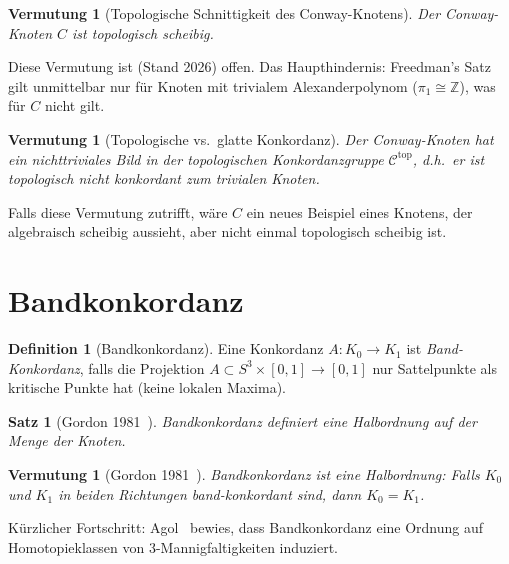 \documentclass[12pt,a4paper]{amsart}
\newtheorem{satz}[theorem]{Satz}
\newtheorem{vermutung}[theorem]{Vermutung}
\theoremstyle{definition}
\newtheorem{definition_de}[theorem]{Definition}
\theoremstyle{remark}
\newcommand{\Z}{\mathbb{Z}}
\begin{document}
\begin{vermutung}[Topologische Schnittigkeit des Conway-Knotens]
\label{verm:Conway-top}
Der Conway-Knoten $C$ ist topologisch scheibig.
\end{vermutung}

Diese Vermutung ist (Stand 2026) offen. Das Haupthindernis: Freedman's
Satz gilt unmittelbar nur für Knoten mit trivialem Alexanderpolynom
($\pi_1 \cong \Z$), was für $C$ nicht gilt.

\begin{vermutung}[Topologische vs.\ glatte Konkordanz]
Der Conway-Knoten hat ein nichttriviales Bild in der topologischen
Konkordanzgruppe $\mathcal{C}^{\mathrm{top}}$, d.h.\ er ist topologisch
nicht konkordant zum trivialen Knoten.
\end{vermutung}

Falls diese Vermutung zutrifft, wäre $C$ ein neues Beispiel eines Knotens,
der algebraisch scheibig aussieht, aber nicht einmal topologisch scheibig ist.

\section{Bandkonkordanz}

\begin{definition_de}[Bandkonkordanz]
Eine Konkordanz $A \colon K_0 \to K_1$ ist \emph{Band-Konkordanz}, falls
die Projektion $A \subset S^3 \times [0,1] \to [0,1]$ nur Sattelpunkte
als kritische Punkte hat (keine lokalen Maxima).
\end{definition_de}

\begin{satz}[Gordon 1981~\cite{Gordon1981}]
Bandkonkordanz definiert eine Halbordnung auf der Menge der Knoten.
\end{satz}

\begin{vermutung}[Gordon 1981~\cite{Gordon1981}]
\label{verm:Gordon}
Bandkonkordanz ist eine Halbordnung: Falls $K_0$ und $K_1$ in beiden
Richtungen band-konkordant sind, dann $K_0 = K_1$.
\end{vermutung}

Kürzlicher Fortschritt: Agol~\cite{Agol2022} bewies, dass Bandkonkordanz
eine Ordnung auf Homotopieklassen von 3-Mannigfaltigkeiten induziert.

\end{document}
